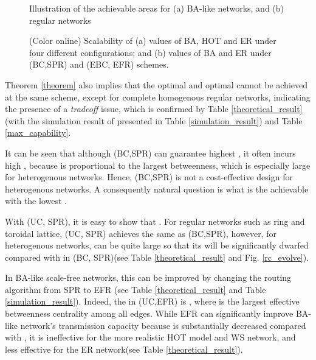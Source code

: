 \documentclass[journal]{IEEEtran}
\begin{document}
{\begin{figure*}[!t]
 
\caption{Illustration of the achievable areas for (a) BA-like
networks, and (b) regular networks}
\label{design-space-illustration}
\end{figure*}





\begin{figure*}[!t]
\centering
 \caption{(Color online) Scalability of (a)
values of BA, HOT and ER under four different configurations; and
(b)  values of BA and ER under (BC,SPR) and (EBC, EFR)
schemes.} \label{evolvability}

\end{figure*}
Theorem \ref{theorem} also implies that the optimal  and
optimal  cannot be achieved at the same scheme, except for
complete homogenous regular networks, indicating the presence of a
\emph{tradeoff} issue, which is confirmed by Table
\ref{theoretical_result}(with the simulation result of 
presented in Table \ref{simulation_result}) and Table
\ref{max_capability}.

It can be seen that although (BC,SPR) can guarantee highest ,
it often incurs high , because
 is proportional to the largest
betweenness, which is especially large for heterogenous networks.
Hence, (BC,SPR) is not a cost-effective design for heterogenous
networks. A consequently natural question is what is the achievable
 with the lowest .



With (UC, SPR), it is easy to show that
. For regular networks such as ring and
toroidal lattice, (UC, SPR) achieves the same  as (BC,SPR),
however, for heterogenous networks,  can be quite large so
that its  will be significantly dwarfed compared with  in
(BC, SPR)(see Table \ref{theoretical_result} and Fig.
\ref{rc_evolve}).

In BA-like scale-free networks, this  can be improved by
changing the routing algorithm from SPR to EFR (see Table
\ref{theoretical_result} and Table \ref{simulation_result}). Indeed,
the  in (UC,EFR) is ,
where  is the largest effective betweenness
centrality among all edges. While EFR can significantly improve
BA-like network's transmission capacity because  is
substantially decreased compared with , it is ineffective
for the more realistic HOT model and WS network, and less effective
for the ER network(see Table \ref{theoretical_result}).

}
\end{document}
